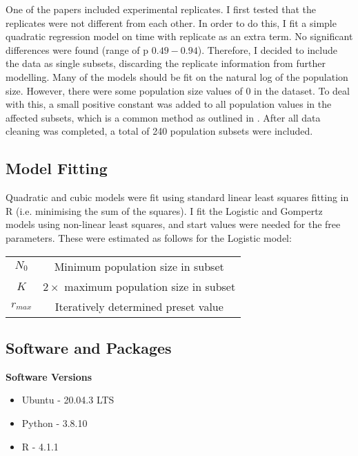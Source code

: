 \documentclass[11pt,a4wide,titlepage]{article}
\begin{document}
One of the papers \citep{bernhardtMetabolicTheoryTemperatureSize2018} included experimental replicates. I first tested that the replicates were not different from each other. In order to do this, I fit a simple quadratic regression model on time with replicate as an extra term. No significant differences were found (range of p $0.49 - 0.94$). Therefore, I decided to include the data as single subsets, discarding the replicate information from further modelling. Many of the models should be fit on the natural log of the population size. However, there were some population size values of 0 in the dataset. To deal with this, a small positive constant was added to all population values in the affected subsets, which is a common method as outlined in \cite{bellegoDealingLogsZeros2021}. After all data cleaning was completed, a total of 240 population subsets were included.

\subsection*{Model Fitting}
Quadratic and cubic models were fit using standard linear least squares fitting in R (i.e. minimising the sum of the squares). I fit the Logistic and Gompertz models using non-linear least squares, and start values were needed for the free parameters. These were estimated as follows for the Logistic model:
\begin{center}
\begin{tabular}{cc}
	$N_0$ & Minimum population size in subset\\
	$K$ & $2\times$ maximum population size in subset\\
	$r_{max}$ & Iteratively determined preset value\\
\end{tabular}
\end{center}

\subsection*{Software and Packages}
\textbf{Software Versions}
\begin{itemize}
    \item Ubuntu - 20.04.3 LTS
    \item Python - 3.8.10
    \item R - 4.1.1
\end{itemize}
\end{document}
